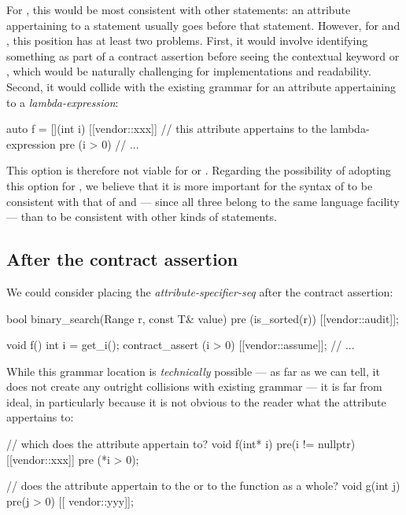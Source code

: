 For , this would be most consistent with other statements: an attribute appertaining to a statement usually goes before that statement. However, for  and , this position has at least two problems. First, it would involve identifying something as part of a
contract assertion before seeing the contextual keyword  or , which would be naturally challenging for implementations and
readability. Second, it would collide with the existing grammar for an attribute appertaining to a \emph{lambda-expression}:

\begin{codeblock}
auto f = [](int i) [[vendor::xxx]]  // this attribute appertains to the lambda-expression
  pre (i > 0) {
  // ...
}
\end{codeblock}

This option is therefore not viable for  or . Regarding the possibility of adopting this option for , we believe that it is more important for the syntax of  to be consistent with that of  and  --- since all three belong to the same language facility --- than to be consistent with other kinds of statements.

\subsection{After the contract assertion}
We could consider placing the \emph{attribute-specifier-seq} after the contract assertion:
\begin{codeblock}
bool binary_search(Range r, const T& value)
  pre (is_sorted(r)) [[vendor::audit]];
  
void f() {
  int i = get_i();
  contract_assert (i > 0) [[vendor::assume]];
  // ...
}
\end{codeblock}
While this grammar location is \emph{technically} possible --- as far as we can tell, it does not create any outright collisions with existing grammar --- it is far from ideal, in particularly because it is not obvious to the reader what the attribute appertains to:
\begin{codeblock}
// which  does the attribute appertain to?
void f(int* i) pre(i != nullptr) [[vendor::xxx]] pre (*i > 0);  

// does the attribute appertain to the  or to the function  as a whole?
void g(int j) pre(j > 0) [[ vendor::yyy]]; 
\end{codeblock}

